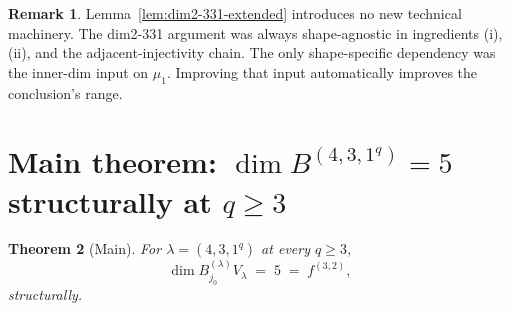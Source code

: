 \documentclass[11pt]{article}
\newtheorem{theorem}{Theorem}
\theoremstyle{definition}
\newtheorem{remark}[theorem]{Remark}
\begin{document}
\begin{remark}\label{rem:no-new-ingredient}
Lemma~\ref{lem:dim2-331-extended} introduces no new technical
machinery. The dim2-331 argument was always shape-agnostic in
ingredients (i), (ii), and the adjacent-injectivity chain. The only
shape-specific dependency was the inner-dim input on $\mu_1$.
Improving that input automatically improves the conclusion's range.
\end{remark}

\section{Main theorem: $\dim B^{(4, 3, 1^q)} = 5$ structurally at $q \ge 3$}\label{sec:main}

\begin{theorem}[Main]\label{thm:main}
For $\lambda = (4, 3, 1^q)$ at every $q \ge 3$,
\[
   \dim B^{(\lambda)}_{j_0} V_\lambda \;=\; 5 \;=\; f^{(3, 2)},
\]
\emph{structurally}.
\end{theorem}
\end{document}
